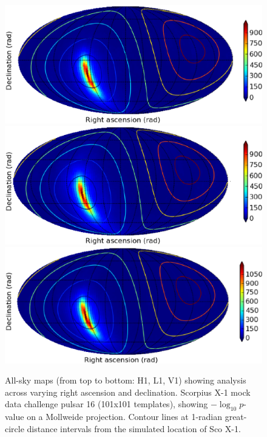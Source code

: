 \documentclass[12pt]{iopart}
\begin{document}
\begin{figure}
\begin{center}
\includegraphics[width=0.6\paperwidth,height=0.2\paperheight]{plots/maptrueH1.eps}
\includegraphics[width=0.6\paperwidth,height=0.2\paperheight]{plots/maptrueL1.eps}
\includegraphics[width=0.6\paperwidth,height=0.2\paperheight]{plots/maptrueV1.eps}
\caption{ All-sky maps (from top to bottom: H1, L1, V1) showing analysis across varying right ascension and declination. 
Scorpius X-1 mock data challenge pulsar 16 (101x101 templates), showing $-\log_{10}p$-value on a Mollweide projection.
Contour lines at 1-radian great-circle distance intervals from the simulated location of Sco X-1.
}
\label{scox1-allsky-maps}
\end{center}
\end{figure}
\end{document}
